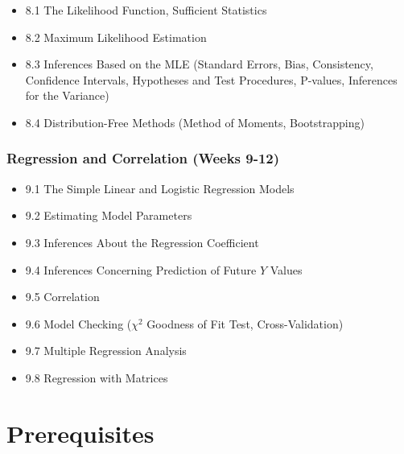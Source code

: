 \documentclass[]{book}
\providecommand{\tightlist}{%
  \setlength{\itemsep}{0pt}\setlength{\parskip}{0pt}}
\theoremstyle{definition}
\theoremstyle{definition}
\theoremstyle{definition}
\theoremstyle{remark}
\begin{document}
\begin{itemize}
\tightlist
\item
  8.1 The Likelihood Function, Sufficient Statistics\\
\item
  8.2 Maximum Likelihood Estimation\\
\item
  8.3 Inferences Based on the MLE (Standard Errors, Bias, Consistency,
  Confidence Intervals, Hypotheses and Test Procedures, P-values,
  Inferences for the Variance)\\
\item
  8.4 Distribution-Free Methods (Method of Moments, Bootstrapping)
\end{itemize}

\subsection*{Regression and Correlation (Weeks
9-12)}\label{regression-and-correlation-weeks-9-12}

\begin{itemize}
\tightlist
\item
  9.1 The Simple Linear and Logistic Regression Models\\
\item
  9.2 Estimating Model Parameters\\
\item
  9.3 Inferences About the Regression Coefficient\\
\item
  9.4 Inferences Concerning Prediction of Future \(Y\) Values\\
\item
  9.5 Correlation\\
\item
  9.6 Model Checking (\(\chi^2\) Goodness of Fit Test,
  Cross-Validation)\\
\item
  9.7 Multiple Regression Analysis\\
\item
  9.8 Regression with Matrices
\end{itemize}

\chapter*{Prerequisites}\label{prerequisites}
\end{document}
